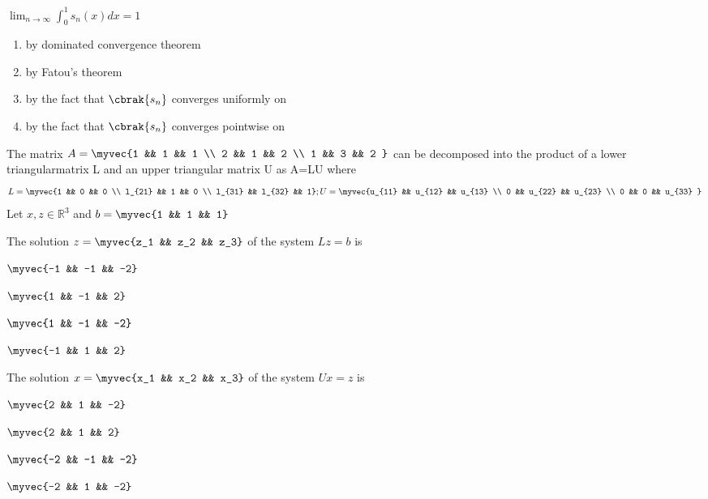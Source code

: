 \iffalse
\title{GATE Questions 6}
\author{EE24BTECH11012 - Bhavanisankar G S}
\section{ma}
\chapter{2011}
\fi
	\item $\lim_{n \to \infty} \int_{0}^{1} s_n(x) dx = 1 $
		\begin{enumerate}
			\item by dominated convergence theorem
			\item by Fatou's theorem
			\item by the fact that $\cbrak{s_n}$ converges uniformly on 
			\item by the fact that $\cbrak{s_n}$ converges pointwise on 
		\end{enumerate}
	The matrix $A = \myvec{1 && 1 && 1 \\ 2 && 1 && 2 \\ 1 && 3 && 2 }$ can be decomposed into the product of a lower triangularmatrix L and an upper triangular matrix U as A=LU where
		$$ L = \myvec{1 && 0 && 0 \\ l_{21} && 1 && 0 \\ l_{31} && l_{32} && 1} ; U = \myvec{u_{11} && u_{12} && u_{13} \\ 0 && u_{22} && u_{23} \\ 0 && 0 && u_{33} } $$
		Let $x, z \in \mathbb{R}^3$ and $b = \myvec{1 && 1 && 1}$
	\item The solution $z = \myvec{z_1 && z_2 && z_3}$ of the system $Lz=b$ is
		\begin{enumerate}
		\end{enumerate}
	\item The solution $x = \myvec{x_1 && x_2 && x_3}$ of the system $Ux=z$ is
		\begin{enumerate}
				\begin{multicols}{2}
				\item $\myvec{2 && 1 && -2}$
				\item $\myvec{2 && 1 && 2}$
				\item $\myvec{-2 && -1 && -2}$
				\item $\myvec{-2 && 1 && -2}$
				\end{multicols}
		\end{enumerate}
